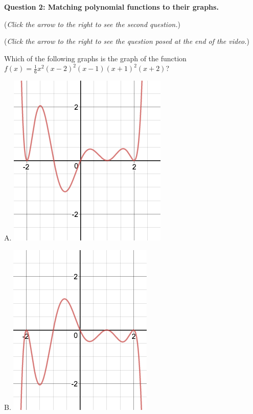 \documentclass{ximera}
\begin{document}
\textbf{Question 2: Matching polynomial functions to their graphs.}
\begin{question}
\begin{flushright}
{\color{blue}(\emph{Click the arrow to the right to see the second question.})}
\end{flushright}
\begin{center}
\begin{expandable}
\begin{flushright}
{\color{blue}(\emph{Click the arrow to the right to see the  question
posed at the end of the video.})}
\end{flushright}
\begin{expandable}
Which of the following graphs is the graph of the function $f(x) = \frac{1}{6}x^2(x-2)^2(x-1)(x+1)^2(x+2)$?

\begin{multicols}{3}
\begin{center}
A. \includegraphics[scale=0.25]{Graph1}
\end{center}

\begin{center}
B. \includegraphics[scale=0.25]{Graph2}
\end{center} 
 

\end{multicols}
\end{expandable}
\end{expandable}
\end{center}
\end{question}
\end{document}
